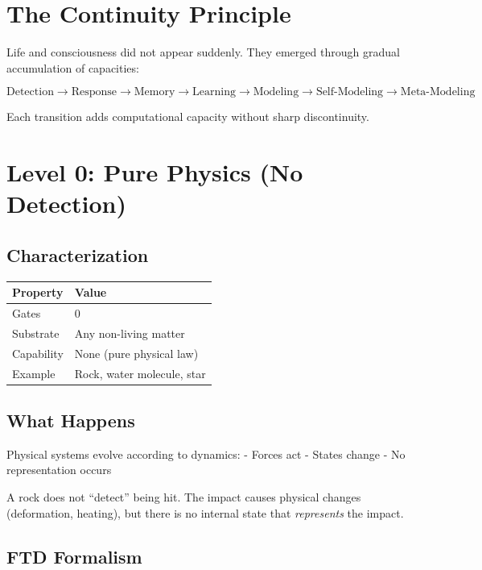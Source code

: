 \documentclass[
  11pt,
  letterpaper,
  twoside,
  openright]{book}
\begin{document}
\section{The Continuity Principle}\label{the-continuity-principle}

Life and consciousness did not appear suddenly. They emerged through
gradual accumulation of capacities:

\[\text{Detection} \to \text{Response} \to \text{Memory} \to \text{Learning} \to \text{Modeling} \to \text{Self-Modeling} \to \text{Meta-Modeling}\]

Each transition adds computational capacity without sharp discontinuity.

\section{Level 0: Pure Physics (No
Detection)}\label{level-0-pure-physics-no-detection}

\subsection{Characterization}\label{characterization}

\begin{longtable}[]{@{}ll@{}}
\toprule\noalign{}
Property & Value \\
\midrule\noalign{}
\endhead
\bottomrule\noalign{}
\endlastfoot
Gates & 0 \\
Substrate & Any non-living matter \\
Capability & None (pure physical law) \\
Example & Rock, water molecule, star \\
\end{longtable}

\subsection{What Happens}\label{what-happens}

Physical systems evolve according to dynamics: - Forces act - States
change - No representation occurs

A rock does not ``detect'' being hit. The impact causes physical changes
(deformation, heating), but there is no internal state that
\emph{represents} the impact.

\subsection{FTD Formalism}\label{ftd-formalism}
\end{document}
